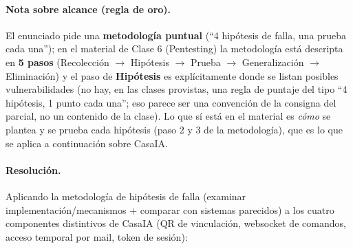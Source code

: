 \paragraph{Nota sobre alcance (regla de oro).}
El enunciado pide una \textbf{metodología puntual} (``4 hipótesis de falla, una
prueba cada una''); en el material de Clase 6 (Pentesting) la metodología está
descripta en \textbf{5 pasos} (Recolección $\to$ Hipótesis $\to$ Prueba $\to$
Generalización $\to$ Eliminación) y el paso de \textbf{Hipótesis} es explícitamente
donde se listan posibles vulnerabilidades (no hay, en las clases provistas, una
regla de puntaje del tipo ``4 hipótesis, 1 punto cada una''; eso parece ser una
convención de la consigna del parcial, no un contenido de la clase). Lo que sí está
en el material es \emph{cómo} se plantea y se prueba cada hipótesis (paso 2 y 3 de
la metodología), que es lo que se aplica a continuación sobre CasaIA.

\paragraph{Resolución.}
Aplicando la metodología de hipótesis de falla (examinar implementación/mecanismos
+ comparar con sistemas parecidos) a los cuatro componentes distintivos de CasaIA
(QR de vinculación, websocket de comandos, acceso temporal por mail, token de
sesión):

